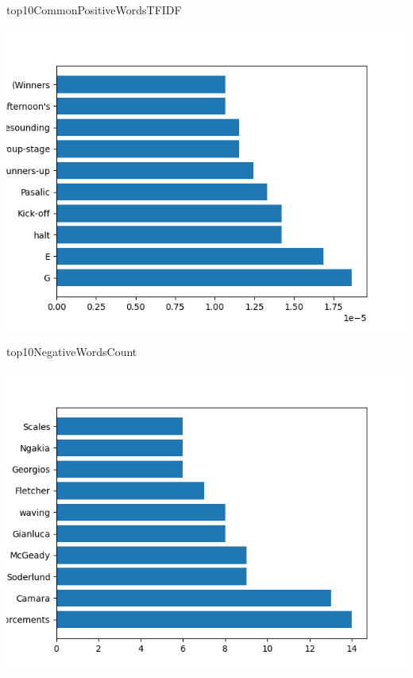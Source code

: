 \documentclass{article}
\begin{document}
top10CommonPositiveWordsTFIDF
\begin{center}
    \includegraphics{top10CommonPositiveWordsTFIDF}
\end{center}

top10NegativeWordsCount
\begin{center}
    \includegraphics{top10NegativeWordsCount}
\end{center}
\end{document}
